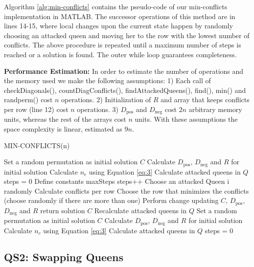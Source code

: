 Algorithm \ref{alg:min-conflicts} contains the pseudo-code of our min-conflicts implementation in MATLAB. The successor operations of this method are in lines 14-15, where local changes upon the current state happen by randomly choosing an attacked queen and moving her to the row with the lowest number of conflicts. The above procedure is repeated until a maximum number of steps is reached or a solution is found. The outer while loop guarantees completeness.

\textbf{Performance Estimation:} In order to estimate the number of operations and the memory used we make the following assumptions: 1) Each call of checkDiagonals(), countDiagConflicts(), findAttackedQueens(), find(), min() and randperm() cost $n$ operations. 2) Initialization of $R$ and array that keeps conflicts per row (line 12) cost $n$ operations. 3) $D_{\text{pos}}$ and $D_{\text{neg}}$ cost $2n$ arbitrary memory units, whereas the rest of the arrays cost $n$ units. With these assumptions the space complexity is linear, estimated as $9n$.

\begin{algorithm}
\caption{MIN-CONFLICTS(n)}\label{alg:min-conflicts}
\begin{algorithmic}[1]
\State Set a random permutation as initial solution $C$
\State Calculate $D_{\text{pos}}$, $D_{\text{neg}}$ and $R$ for initial solution
\State Calculate $n_c$ using Equation \ref{eq:3}
\State Calculate attacked queens in $Q$
\State steps = 0
\State Define constants maxSteps
\State steps++
\State Choose an attacked Queen i randomly
\State Calculate conflicts per row
\EndFor
\State Choose the row that minimizes the conflicts (choose randomly if there are more than one)
\State Perform change updating $C$, $D_{\text{pos}}$, $D_{\text{neg}}$ and $R$
\State return solution $C$
\Else
\State Recalculate attacked queens in $Q$
\EndIf
\EndWhile
\State Set a random permutation as initial solution $C$
\State Calculate $D_{\text{pos}}$, $D_{\text{neg}}$ and $R$ for initial solution
\State Calculate $n_c$ using Equation \ref{eq:3}
\State Calculate attacked queens in $Q$
\State steps = 0
\EndWhile
\end{algorithmic}
\end{algorithm}

\newpage
\subsection{QS2: Swapping Queens}

